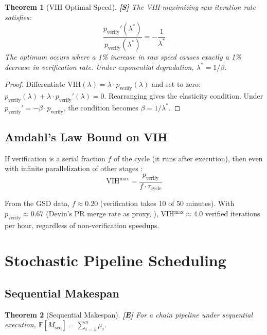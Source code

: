 \documentclass[11pt, a4paper, logo, copyright]{googledeepmind}
\newtheorem{theorem}{Theorem}[section]
\newcommand{\VIH}{\mathrm{VIH}}
\newcommand{\E}{\mathbb{E}}
\begin{document}
\begin{theorem}[VIH Optimal Speed]\label{thm:vih-opt}
\textbf{[S]} The VIH-maximizing raw iteration rate satisfies:
\[
    \frac{p_{\mathrm{verify}}'(\lambda^*)}{p_{\mathrm{verify}}(\lambda^*)} = -\frac{1}{\lambda^*}
\]
The optimum occurs where a 1\% increase in raw speed causes exactly a 1\% decrease in verification rate. Under exponential degradation, $\lambda^* = 1/\beta$.
\end{theorem}

\begin{proof}
Differentiate $\VIH(\lambda) = \lambda \cdot p_{\mathrm{verify}}(\lambda)$ and set to zero: $p_{\mathrm{verify}}(\lambda) + \lambda \cdot p_{\mathrm{verify}}'(\lambda) = 0$. Rearranging gives the elasticity condition. Under $p_{\mathrm{verify}}' = -\beta \cdot p_{\mathrm{verify}}$, the condition becomes $\beta = 1/\lambda^*$.
\end{proof}

\subsection{Amdahl's Law Bound on VIH}

If verification is a serial fraction $f$ of the cycle (it runs after execution), then even with infinite parallelization of other stages \citep{amdahl1967validity}:
\[
    \VIH^{\max} = \frac{p_{\mathrm{verify}}}{f \cdot \tau_{\mathrm{cycle}}}
\]

From the GSD data, $f \approx 0.20$ (verification takes 10 of 50 minutes). With $p_{\mathrm{verify}} \approx 0.67$ (Devin's PR merge rate as proxy, \citealt{cognition2025devin}), VIH$^{\max} \approx 4.0$ verified iterations per hour, regardless of non-verification speedups.


\section{Stochastic Pipeline Scheduling}\label{sec:scheduling}

\subsection{Sequential Makespan}

\begin{theorem}[Sequential Makespan]\label{thm:seq}
\textbf{[E]} For a chain pipeline under sequential execution, $\E[M_{\mathrm{seq}}] = \sum_{i=1}^n \mu_i$.
\end{theorem}
\end{document}
